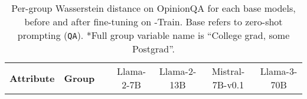 \begin{table*}[ht]
    \hspace{-2em}
    \centering
    \scriptsize
    \captionsetup{font=small}
    \caption{
    Per-group Wasserstein distance on OpinionQA for each base models, before and after fine-tuning on \OURDATA-Train. Base refers to zero-shot prompting (\texttt{QA}). *Full group variable name is ``College grad, some Postgrad''.
    }
    \label{table:per_group_opinionqa}
    \begin{tabular}{cc|c|cc|cc|cc|cc}
    \toprule
    \multirow{2}{*}{\textbf{Attribute}}
    & \multirow{2}{*}{\textbf{Group}}
    & \multirow{1}{*}{}
    & \multicolumn{2}{c|}{Llama-2-7B}
    & \multicolumn{2}{c|}{Llama-2-13B}
    & \multicolumn{2}{c|}{Mistral-7B-v0.1} 
    & \multicolumn{2}{c}{Llama-3-70B} \\


\end{tabular}
\end{table*}

